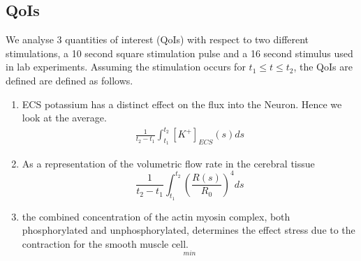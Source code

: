 \documentclass[12pt]{article}
\numberwithin{equation}{section}
\begin{document}
\subsection{QoIs}
We analyse 3 quantities of interest (QoIs) with respect to two different stimulations, a 10 second square stimulation pulse and a 16 second stimulus used in lab experiments. Assuming the stimulation occurs for $t_1\le t \le t_2$, the QoIs are defined are defined as follows.
\begin{enumerate}
\item ECS potassium has a distinct effect on the flux into the Neuron. Hence we look at the average.
\begin{eqnarray}
 \frac{1}{t_2-t_1}\int_{t_1}^{t_2}[K^+]_{ECS}(s)ds \label{K_ECS_Mean}
\end{eqnarray}

\item As a representation of the volumetric flow rate in the cerebral tissue
\begin{equation}
\frac{1}{t_2-t_1}\int_{t_1}^{t_2}\left(\frac{R(s)}{R_0}\right)^4ds \label{vol_flow}
\end{equation}
 
\item the combined concentration of the actin myosin complex, both phosphorylated and unphosphorylated, determines the effect stress due to the contraction for the smooth muscle cell. 
\begin{eqnarray}
[AM+AM_p]_{min} \label{AM_AMp_Min}
\end{eqnarray}

\end{enumerate}
\end{document}
